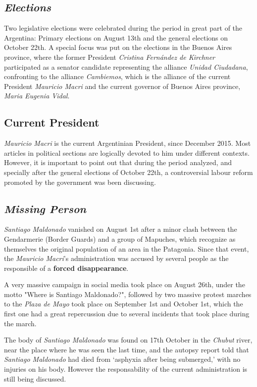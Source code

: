 \documentclass{bmcart}
\begin{document}
\begin{backmatter}
\label{sec:Context}

\subsection*{\emph{Elections}}
\par Two legislative elections were celebrated during the period in great part of the Argentina: Primary elections on August 13th and the general elections on October 22th. 
A special focus was put on the elections in the Buenos Aires province, where the former President \emph{Cristina Fernández de Kirchner} participated as a senator candidate representing the alliance \emph{Unidad Ciudadana}, confronting to the alliance \emph{Cambiemos}, which is the alliance of the current President \emph{Mauricio Macri} and the current governor of Buenos Aires province, \emph{Maria Eugenia Vidal}.
 
\subsection*{Current President}
\par \emph{Mauricio Macri} is the current Argentinian President, since December 2015. 
Most articles in political sections are logically devoted to him under different contexts.
However, it is important to point out that during the period analyzed, and specially after the general elections of October 22th, a controversial labour reform promoted by the government was been discussing.

\subsection*{\emph{Missing Person}}
\par \emph{Santiago Maldonado} vanished on August 1st after a minor clash between the Gendarmerie (Border Guards) and a group of Mapuches, which recognize as themselves the original population of an area in the Patagonia.
Since that event, the \emph{Mauricio Macri}'s administration was accused by several people as the responsible of a \textbf{forced disappearance}. 
\par A very massive campaign in social media took place on August 26th, under the motto "Where is Santiago Maldonado?", followed by two massive protest marches to the \emph{Plaza de Mayo} took place on September 1st and October 1st, which the first one had a great repercussion due to several incidents that took place during the march.
\par The body of \emph{Santiago Maldonado} was found on 17th October in the \emph{Chubut} river, near the place where he was seen the last time, and the autopsy report told that \emph{Santiago Maldonado} had died from ‘asphyxia after being submerged,’ with no injuries on his body. 
However the responsability of the current administration is still being discussed.


\end{backmatter}
\end{document}
